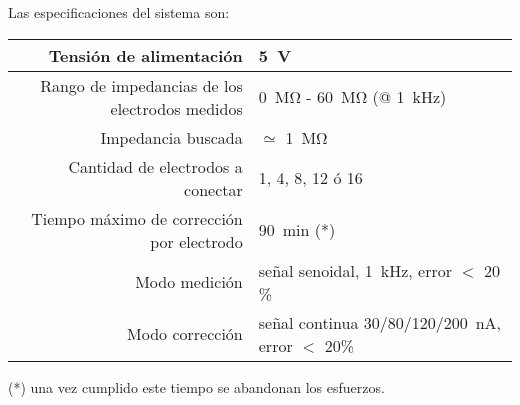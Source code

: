 Las especificaciones del sistema son:

\begin{table}[H]
\begin{center}
\begin{tabular}{|r|l|}
    \hline
    Tensión de alimentación &
    \SI{5}{\volt} \\ \hline
    Rango de impedancias de los electrodos medidos &
    \SI{0}{\mega\ohm} - \SI{60}{\mega\ohm} (@ \SI{1}{\kilo\hertz})\\ \hline
    Impedancia buscada & $\simeq$ \SI{1}{\mega\ohm}\\ \hline
    Cantidad de electrodos a conectar &
    1, 4, 8, 12 ó 16 \\ \hline
    Tiempo máximo de corrección por electrodo &
    \SI{90}{\minute} (*)\\ \hline
    Modo medición & señal senoidal, \SI{1}{\kilo\hertz}, error $<$ 20 \% \\ \hline
    Modo corrección & señal continua 30/80/120/\SI{200}{\nano\ampere}, error $<$ 20\% \\ \hline
\end{tabular}
\end{center}
\end{table}

(*) una vez cumplido este tiempo se abandonan los esfuerzos.



